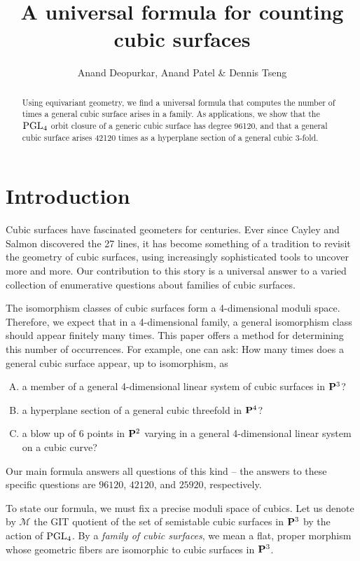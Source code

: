 \documentclass[12pt,reqno]{amsart}
\title{A universal formula for counting cubic surfaces}
\author{Anand Deopurkar, Anand Patel
  \& Dennis Tseng}
\numberwithin{equation}{section}
\begin{document}
\maketitle

\begin{abstract}
  Using equivariant geometry, we find a universal formula that
  computes the number of times a general cubic surface arises in a
  family.  As applications, we show that the $\PGL_4$ orbit closure of
  a generic cubic surface has degree 96120, and that a general cubic
  surface arises 42120 times as a hyperplane section of a general
  cubic 3-fold.
\end{abstract}




\section{Introduction}
\label{sec:intro}

Cubic surfaces have fascinated geometers for centuries. Ever since
Cayley and Salmon discovered the 27 lines, it has become something of
a tradition to revisit the geometry of cubic surfaces, using
increasingly sophisticated tools to uncover more and more. Our
contribution to this story is a universal answer to a varied
collection of enumerative questions about families of cubic surfaces.

The isomorphism classes of cubic surfaces form a 4-dimensional moduli
space. Therefore, we expect that in a 4-dimensional family, a general
isomorphism class should appear finitely many times. This paper offers
a method for determining this number of occurrences. For example, one
can ask: How many times does a general cubic surface appear, up to
isomorphism, as
\begin{enumerate}[(A)]
\item \label{orbit} a member of a general 4-dimensional linear system
  of cubic surfaces in $\P^3$?
\item \label{slice} a hyperplane section of a general cubic threefold in $\P^4$?
\item a blow up of 6 points in $\P^2$ varying in a general
  4-dimensional linear system on a cubic curve?
\end{enumerate}
Our main formula answers all questions of this kind -- the answers to
these specific questions are $96120$, $42120$, and $25920$,
respectively.

To state our formula, we must fix a precise moduli space of cubics.
Let us denote by $\mathcal M$ the GIT quotient of the set of
semistable cubic surfaces in $\P^3$ by the action of $\PGL_4$.  By a
\emph{family of cubic surfaces}, we mean a flat, proper morphism whose
geometric fibers are isomorphic to cubic surfaces in $\P^3$.
\end{document}
